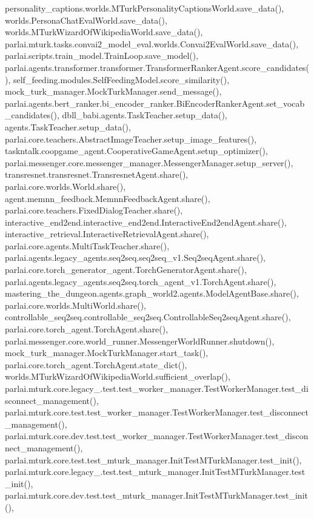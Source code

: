 personality\+\_\+captions.\+worlds.\+M\+Turk\+Personality\+Captions\+World.\+save\+\_\+data(), worlds.\+Persona\+Chat\+Eval\+World.\+save\+\_\+data(), worlds.\+M\+Turk\+Wizard\+Of\+Wikipedia\+World.\+save\+\_\+data(), parlai.\+mturk.\+tasks.\+convai2\+\_\+model\+\_\+eval.\+worlds.\+Convai2\+Eval\+World.\+save\+\_\+data(), parlai.\+scripts.\+train\+\_\+model.\+Train\+Loop.\+save\+\_\+model(), parlai.\+agents.\+transformer.\+transformer.\+Transformer\+Ranker\+Agent.\+score\+\_\+candidates(), self\+\_\+feeding.\+modules.\+Self\+Feeding\+Model.\+score\+\_\+similarity(), mock\+\_\+turk\+\_\+manager.\+Mock\+Turk\+Manager.\+send\+\_\+message(), parlai.\+agents.\+bert\+\_\+ranker.\+bi\+\_\+encoder\+\_\+ranker.\+Bi\+Encoder\+Ranker\+Agent.\+set\+\_\+vocab\+\_\+candidates(), dbll\+\_\+babi.\+agents.\+Task\+Teacher.\+setup\+\_\+data(), agents.\+Task\+Teacher.\+setup\+\_\+data(), parlai.\+core.\+teachers.\+Abstract\+Image\+Teacher.\+setup\+\_\+image\+\_\+features(), taskntalk.\+coopgame\+\_\+agent.\+Cooperative\+Game\+Agent.\+setup\+\_\+optimizer(), parlai.\+messenger.\+core.\+messenger\+\_\+manager.\+Messenger\+Manager.\+setup\+\_\+server(), transresnet.\+transresnet.\+Transresnet\+Agent.\+share(), parlai.\+core.\+worlds.\+World.\+share(), agent.\+memnn\+\_\+feedback.\+Memnn\+Feedback\+Agent.\+share(), parlai.\+core.\+teachers.\+Fixed\+Dialog\+Teacher.\+share(), interactive\+\_\+end2end.\+interactive\+\_\+end2end.\+Interactive\+End2end\+Agent.\+share(), interactive\+\_\+retrieval.\+Interactive\+Retrieval\+Agent.\+share(), parlai.\+core.\+agents.\+Multi\+Task\+Teacher.\+share(), parlai.\+agents.\+legacy\+\_\+agents.\+seq2seq.\+seq2seq\+\_\+v1.\+Seq2seq\+Agent.\+share(), parlai.\+core.\+torch\+\_\+generator\+\_\+agent.\+Torch\+Generator\+Agent.\+share(), parlai.\+agents.\+legacy\+\_\+agents.\+seq2seq.\+torch\+\_\+agent\+\_\+v1.\+Torch\+Agent.\+share(), mastering\+\_\+the\+\_\+dungeon.\+agents.\+graph\+\_\+world2.\+agents.\+Model\+Agent\+Base.\+share(), parlai.\+core.\+worlds.\+Multi\+World.\+share(), controllable\+\_\+seq2seq.\+controllable\+\_\+seq2seq.\+Controllable\+Seq2seq\+Agent.\+share(), parlai.\+core.\+torch\+\_\+agent.\+Torch\+Agent.\+share(), parlai.\+messenger.\+core.\+world\+\_\+runner.\+Messenger\+World\+Runner.\+shutdown(), mock\+\_\+turk\+\_\+manager.\+Mock\+Turk\+Manager.\+start\+\_\+task(), parlai.\+core.\+torch\+\_\+agent.\+Torch\+Agent.\+state\+\_\+dict(), worlds.\+M\+Turk\+Wizard\+Of\+Wikipedia\+World.\+sufficient\+\_\+overlap(), parlai.\+mturk.\+core.\+legacy\+\_.\+test.\+test\+\_\+worker\+\_\+manager.\+Test\+Worker\+Manager.\+test\+\_\+disconnect\+\_\+management(), parlai.\+mturk.\+core.\+test.\+test\+\_\+worker\+\_\+manager.\+Test\+Worker\+Manager.\+test\+\_\+disconnect\+\_\+management(), parlai.\+mturk.\+core.\+dev.\+test.\+test\+\_\+worker\+\_\+manager.\+Test\+Worker\+Manager.\+test\+\_\+disconnect\+\_\+management(), parlai.\+mturk.\+core.\+test.\+test\+\_\+mturk\+\_\+manager.\+Init\+Test\+M\+Turk\+Manager.\+test\+\_\+init(), parlai.\+mturk.\+core.\+legacy\+\_.\+test.\+test\+\_\+mturk\+\_\+manager.\+Init\+Test\+M\+Turk\+Manager.\+test\+\_\+init(), parlai.\+mturk.\+core.\+dev.\+test.\+test\+\_\+mturk\+\_\+manager.\+Init\+Test\+M\+Turk\+Manager.\+test\+\_\+init(), 